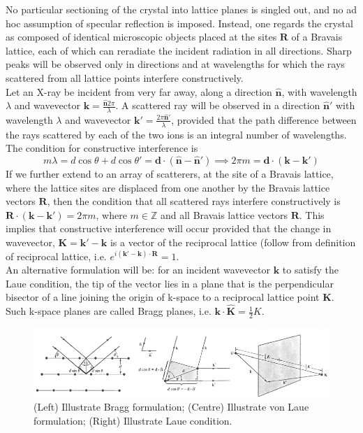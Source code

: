 \documentclass[a4paper]{article}
\begin{document}
\begin{Note}
No particular sectioning of the crystal into lattice planes is singled out, and no ad hoc assumption of specular reflection is imposed. Instead, one regards the crystal as composed of identical microscopic objects placed at the sites $\mathbf{R}$ of a Bravais lattice, each of which can reradiate the incident radiation in all directions. Sharp peaks will be observed only in directions and at wavelengths for which the rays scattered from all lattice points interfere constructively.\\[5pt]
Let an X-ray be incident from very far away, along a direction $\mathbf{\hat{n}}$, with wavelength $\lambda$ and wavevector $\mathbf{k}=\frac{\mathbf{\hat{n}}2\pi}{\lambda}$. A scattered ray will be observed in a direction $\mathbf{\hat{n}'}$ with wavelength $\lambda$ and wavevector $\mathbf{k'}=\frac{2\pi\mathbf{\hat{n}'}}{\lambda}$, provided that the path difference between the rays scattered by each of the two ions is an integral number of wavelengths. The condition for constructive interference is
$$m\lambda=d\cos\theta+d\cos\theta'=\mathbf{d}\cdot(\mathbf{\hat{n}}-\mathbf{\hat{n}'})\implies 2\pi m=\mathbf{d}\cdot(\mathbf{k}-\mathbf{k'})$$
If we further extend to an array of scatterers, at the site of a Bravais lattice, where the lattice sites are displaced from one another by the Bravais lattice vectors $\mathbf{R}$, then the condition that all scattered rays interfere constructively is $\mathbf{R}\cdot(\mathbf{k}-\mathbf{k'})=2\pi m$, where $m\in\mathbb{Z}$ and all Bravais lattice vectors $\mathbf{R}$. This implies that constructive interference will occur provided that the change in wavevector, $\mathbf{K}=\mathbf{k'}-\mathbf{k}$ is a vector of the reciprocal lattice (follow from definition of reciprocal lattice, i.e. $e^{i(\mathbf{k'}-\mathbf{k})\cdot\mathbf{R}}=1$.\\[5pt]
An alternative formulation will be: for an incident wavevector $\mathbf{k}$ to satisfy the Laue condition, the tip of the vector lies in a plane that is the perpendicular bisector of a line joining the origin of k-space to a reciprocal lattice point $\mathbf{K}$. Such k-space planes are called Bragg planes, i.e. $\mathbf{k}\cdot\mathbf{\hat{K}}=\frac{1}{2}K$.
\end{Note}
\begin{figure}[H]
    \centering
    \includegraphics[width=\linewidth]{crystaldiffraction.PNG}
    \caption{(Left) Illustrate Bragg formulation; (Centre) Illustrate von Laue formulation; (Right) Illustrate Laue condition. \cite{ashcroft1976solid}}
\end{figure}
\end{document}
